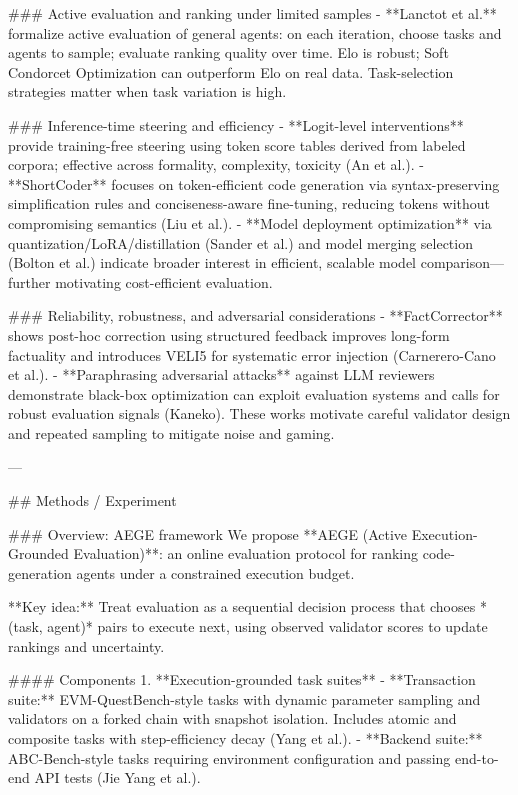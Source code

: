 ### Active evaluation and ranking under limited samples  
- **Lanctot et al.** formalize active evaluation of general agents: on each iteration, choose tasks and agents to sample; evaluate ranking quality over time. Elo is robust; Soft Condorcet Optimization can outperform Elo on real data. Task-selection strategies matter when task variation is high.

### Inference-time steering and efficiency  
- **Logit-level interventions** provide training-free steering using token score tables derived from labeled corpora; effective across formality, complexity, toxicity (An et al.).  
- **ShortCoder** focuses on token-efficient code generation via syntax-preserving simplification rules and conciseness-aware fine-tuning, reducing tokens without compromising semantics (Liu et al.).  
- **Model deployment optimization** via quantization/LoRA/distillation (Sander et al.) and model merging selection (Bolton et al.) indicate broader interest in efficient, scalable model comparison—further motivating cost-efficient evaluation.

### Reliability, robustness, and adversarial considerations  
- **FactCorrector** shows post-hoc correction using structured feedback improves long-form factuality and introduces VELI5 for systematic error injection (Carnerero-Cano et al.).  
- **Paraphrasing adversarial attacks** against LLM reviewers demonstrate black-box optimization can exploit evaluation systems and calls for robust evaluation signals (Kaneko).  
These works motivate careful validator design and repeated sampling to mitigate noise and gaming.

---

## Methods / Experiment  

### Overview: AEGE framework  
We propose **AEGE (Active Execution-Grounded Evaluation)**: an online evaluation protocol for ranking code-generation agents under a constrained execution budget.

**Key idea:** Treat evaluation as a sequential decision process that chooses *(task, agent)* pairs to execute next, using observed validator scores to update rankings and uncertainty.

#### Components  
1. **Execution-grounded task suites**  
   - **Transaction suite:** EVM-QuestBench-style tasks with dynamic parameter sampling and validators on a forked chain with snapshot isolation. Includes atomic and composite tasks with step-efficiency decay (Yang et al.).  
   - **Backend suite:** ABC-Bench-style tasks requiring environment configuration and passing end-to-end API tests (Jie Yang et al.).

